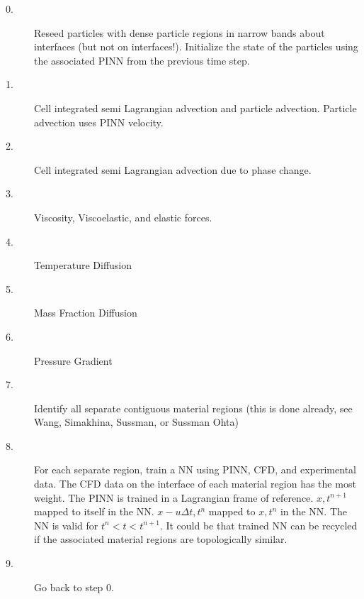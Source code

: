 \documentclass[]{article}
\begin{document}
\begin{description}
	\item[0.] Reseed particles with dense particle regions in narrow
		bands about interfaces (but not on interfaces!).  
		Initialize the state of the particles
		using the associated PINN from the previous time step.
	\item[1.] Cell integrated semi Lagrangian advection and
		particle advection. Particle advection uses PINN velocity.
	\item[2.] Cell integrated semi Lagrangian advection 
		due to phase 
		change.  
	\item[3.] Viscosity, Viscoelastic, and elastic forces.
	\item[4.] Temperature Diffusion
	\item[5.] Mass Fraction Diffusion
	\item[6.] Pressure Gradient
	\item[7.] Identify all separate contiguous material regions (this is
		done already, see Wang, Simakhina, Sussman, or Sussman Ohta)
	\item[8.] For each separate region, train a NN using PINN, CFD, and
		experimental data.
		The CFD data on the interface of each material region has the
		most weight.  The PINN is trained in a Lagrangian frame of 
		reference.  $x,t^{n+1}$ mapped to itself in the NN. 
		$x-u\Delta t,t^{n}$ mapped to $x,t^{n}$ in the NN.  The NN is
		valid for $t^{n}<t<t^{n+1}$.  It could be that trained NN
		can be recycled if the associated material regions 
		are topologically similar.
	\item[9.] Go back to step 0.
\end{description}


\end{document}
